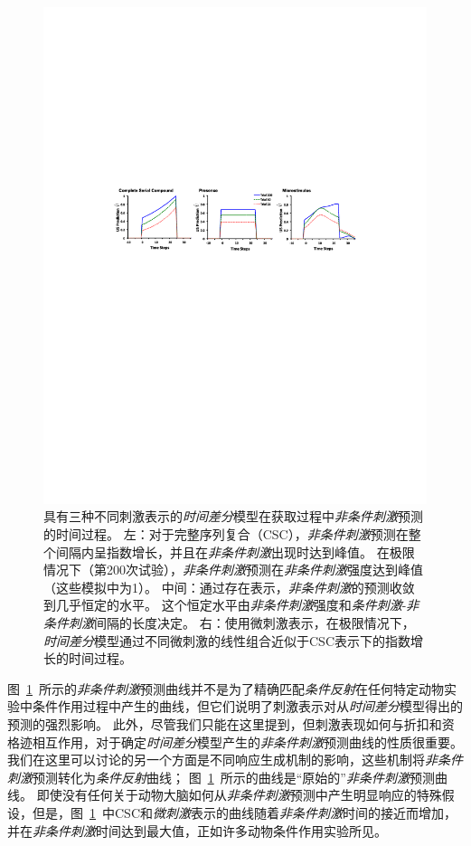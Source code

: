 \begin{figure}[!htb]
	\centering
	\includegraphics[width=0.8\linewidth]{chap11/fig_11_6}
	\caption{具有三种不同刺激表示的\textit{时间差分}模型在获取过程中\textit{非条件刺激}预测的时间过程。
		左：对于完整序列复合（CSC），\textit{非条件刺激}预测在整个间隔内呈指数增长，并且在\textit{非条件刺激}出现时达到峰值。
		在极限情况下（第200次试验），\textit{非条件刺激}预测在\textit{非条件刺激}强度达到峰值（这些模拟中为1）。
		中间：通过存在表示，\textit{非条件刺激}的预测收敛到几乎恒定的水平。
		这个恒定水平由\textit{非条件刺激}强度和\textit{条件刺激}-\textit{非条件刺激}间隔的长度决定。
		右：使用微刺激表示，在极限情况下，\textit{时间差分}模型通过不同微刺激的线性组合近似于CSC表示下的指数增长的时间过程。\label{fig:11_6}}
\end{figure}


图~\ref{fig:11_6}~所示的\textit{非条件刺激}预测曲线并不是为了精确匹配\textit{条件反射}在任何特定动物实验中条件作用过程中产生的曲线，但它们说明了刺激表示对从\textit{时间差分}模型得出的预测的强烈影响。
此外，尽管我们只能在这里提到，但刺激表现如何与折扣和资格迹相互作用，对于确定\textit{时间差分}模型产生的\textit{非条件刺激}预测曲线的性质很重要。
我们在这里可以讨论的另一个方面是不同响应生成机制的影响，这些机制将\textit{非条件刺激}预测转化为\textit{条件反射}曲线；
图~\ref{fig:11_6}~所示的曲线是“原始的”\textit{非条件刺激}预测曲线。
即使没有任何关于动物大脑如何从\textit{非条件刺激}预测中产生明显响应的特殊假设，但是，图~\ref{fig:11_6}~中CSC和\textit{微刺激}表示的曲线随着\textit{非条件刺激}时间的接近而增加，并在\textit{非条件刺激}时间达到最大值，正如许多动物条件作用实验所见。


